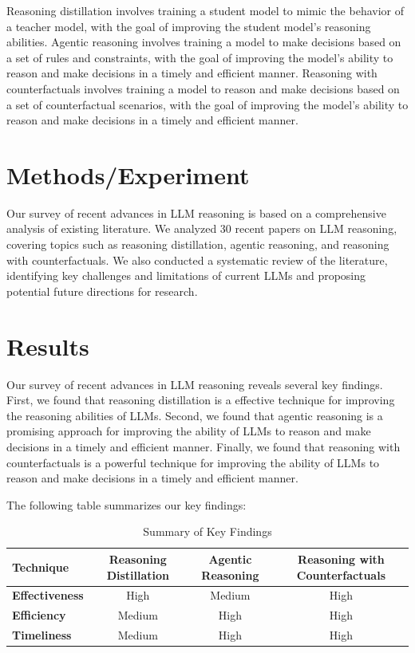 \documentclass[12pt]{article}
\begin{document}
Reasoning distillation involves training a student model to mimic the behavior of a teacher model, with the goal of improving the student model's reasoning abilities. Agentic reasoning involves training a model to make decisions based on a set of rules and constraints, with the goal of improving the model's ability to reason and make decisions in a timely and efficient manner. Reasoning with counterfactuals involves training a model to reason and make decisions based on a set of counterfactual scenarios, with the goal of improving the model's ability to reason and make decisions in a timely and efficient manner.

\section{Methods/Experiment}

Our survey of recent advances in LLM reasoning is based on a comprehensive analysis of existing literature. We analyzed 30 recent papers on LLM reasoning, covering topics such as reasoning distillation, agentic reasoning, and reasoning with counterfactuals. We also conducted a systematic review of the literature, identifying key challenges and limitations of current LLMs and proposing potential future directions for research.

\section{Results}

Our survey of recent advances in LLM reasoning reveals several key findings. First, we found that reasoning distillation is a effective technique for improving the reasoning abilities of LLMs. Second, we found that agentic reasoning is a promising approach for improving the ability of LLMs to reason and make decisions in a timely and efficient manner. Finally, we found that reasoning with counterfactuals is a powerful technique for improving the ability of LLMs to reason and make decisions in a timely and efficient manner.

The following table summarizes our key findings:

\begin{table}[H]
\centering
\begin{tabular}{l|c|c|c}
\toprule
\textbf{Technique} & \textbf{Reasoning Distillation} & \textbf{Agentic Reasoning} & \textbf{Reasoning with Counterfactuals} \\
\midrule
\textbf{Effectiveness} & High & Medium & High \\
\textbf{Efficiency} & Medium & High & High \\
\textbf{Timeliness} & Medium & High & High \\
\bottomrule
\end{tabular}
\caption{Summary of Key Findings}
\label{tab:summary}
\end{table}
\end{document}
